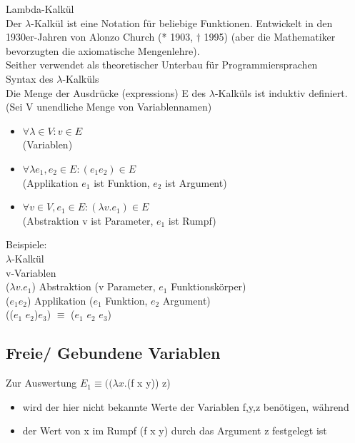 \documentclass[paper=a4, fontsize=11pt]{scrartcl}
\numberwithin{equation}{section}
\numberwithin{figure}{section}
\numberwithin{table}{section}
\begin{document}
\begin{lstlistig}
Lambda-Kalkül \\
Der $\lambda$-Kalkül ist eine Notation für beliebige Funktionen. Entwickelt in den 1930er-Jahren von Alonzo Church (* 1903, $\dagger$ 1995) (aber die Mathematiker bevorzugten die axiomatische Mengenlehre). \\
Seither verwendet als theoretischer Unterbau für Programmiersprachen \\

Syntax des $\lambda$-Kalküls \\
Die Menge der Ausdrücke (expressions) E des $\lambda$-Kalküls ist induktiv definiert. \\
(Sei V unendliche Menge von Variablennamen) \\
\begin{itemize}
\item $\forall \lambda  \in V: v \in E$ \\
        (Variablen) 
\item $\forall \lambda e_{1},e_{2} \in E: (e_{1} e_{2}) \in E$ \\
        (Applikation $e_{1}$ ist Funktion, $e_{2}$ ist Argument)
\item $\forall v \in V, e_{1} \in E: (\lambda v.e_{1}) \in E$ \\
        (Abstraktion v ist Parameter, $e_{1}$ ist Rumpf)
\end{itemize}

Beispiele: \\

$\lambda$-Kalkül \\
v-Variablen \\
($\lambda v.e_{1}$) Abstraktion (v Parameter, $e_{1}$ Funktionskörper) \\
($e_{1} e_{2}$) Applikation ($e_{1}$ Funktion, $e_{2}$ Argument) \\
(($e_{1}$ $e_{2}$)$ e_{3}$) $\equiv$ ($e_{1}$ $e_{2}$ $e_{3}$)

\subsection{Freie/ Gebundene Variablen}
Zur Auswertung $E_{1} \equiv ((\lambda x.$(f x y)) z)
\begin{itemize}
\item wird der hier nicht bekannte Werte der Variablen f,y,z benötigen, während
\item der Wert von x im Rumpf (f x y) durch das Argument z festgelegt ist
\end{itemize} 


\end{lstlistig}
\end{document}
